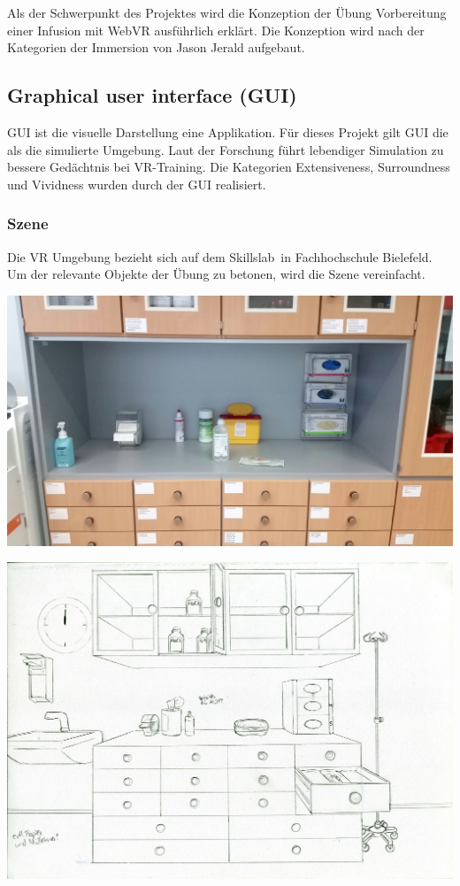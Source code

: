 Als der Schwerpunkt des Projektes wird die Konzeption der Übung Vorbereitung einer Infusion mit WebVR ausführlich erklärt. Die Konzeption wird nach der Kategorien der Immersion von Jason Jerald\citep{28} aufgebaut.

 \subsection{Graphical user interface (GUI)}
 GUI ist die visuelle Darstellung eine Applikation. Für dieses Projekt gilt GUI die als die simulierte Umgebung. Laut der Forschung führt lebendiger Simulation zu bessere Gedächtnis bei VR-Training. \citep{27} Die Kategorien Extensiveness, Surroundness und Vividness wurden durch der GUI realisiert.
 
  \subsubsection{Szene}
  Die VR Umgebung bezieht sich auf dem \glqq Skillslab\grqq\ in Fachhochschule Bielefeld. Um der relevante Objekte der Übung zu betonen, wird die Szene vereinfacht.
  
  \includegraphics[width=\textwidth]{images/RealLabor.jpg}
  
  \includegraphics[width=\textwidth]{images/paperPrototype2.jpg}
  
